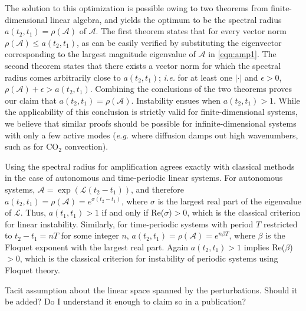 \documentclass[letterpaper,10pt,prl,twocolumn,aps,reprint,superscriptaddress]{revtex4-1}
\newcommand{\cotwo}{CO$_2$ }
\newcommand{\cL}{\boldsymbol{\mathcal{L}}}
\newcommand{\cA}{\boldsymbol{\mathcal{A}}}
\newcommand{\nrm}{{|\cdot|}}
\begin{document}
The solution to this optimization is possible owing to two theorems from finite-dimensional linear algebra, and yields the optimum to be the spectral radius $a(t_2,t_1) = \rho(\cA)$ of $\cA$. 
The first theorem states that for every vector norm $\rho(\cA) \le a(t_2,t_1)$, as can be easily verified by substituting the eigenvector corresponding to the largest magnitude eigenvalue of $\cA$ in \eqref{eqn:amp1}. 
The second theorem states that there exists a vector norm for which the spectral radius comes arbitrarily close to $a(t_2,t_1)$\cite{bulirsch2002introduction}; {\it i.e.} for at least one $\nrm$ and $\epsilon>0$, $\rho (\cA) + \epsilon > a(t_2,t_1)$. 
Combining the conclusions of the two theorems proves our claim that $a(t_2, t_1) = \rho(\cA)$. 
Instability ensues when $a(t_2, t_1) > 1$.
While the applicability of this conclusion is strictly valid for finite-dimensional systems, we believe that similar proofs should be possible for infinite-dimensional systems with only a few active modes ({\it e.g.} where diffusion damps out high wavenumbers, such as for \cotwo convection).

Using the spectral radius for amplification agrees exactly with classical methods in the case of autonomous and time-periodic linear systems. 
For autonomous systems, $\cA = \exp(\cL (t_2-t_1))$, and therefore $a(t_2,t_1) = \rho (\cA) = e^{\sigma (t_2-t_1)}$, where $\sigma$ is the largest real part of the eigenvalue of $\cL$. 
Thus, $a(t_1,t_1)>1$ if and only if Re($\sigma$)$>0$, which is the classical criterion for linear instability.
Similarly, for time-periodic systems with period $T$ restricted to $t_2 -t_1 = n T$ for some integer $n$, $a(t_2, t_1) = \rho (\cA ) = e^{n \beta T}$, where $\beta$ is the Floquet exponent with the largest real part. 
Again $a(t_2,t_1)>1$ implies Re($\beta$)$>0$, which is the classical criterion for instability of periodic systems using Floquet theory.

Tacit assumption about the linear space spanned by the perturbations. Should it be added? Do I understand it enough to claim so in a publication?
\end{document}
